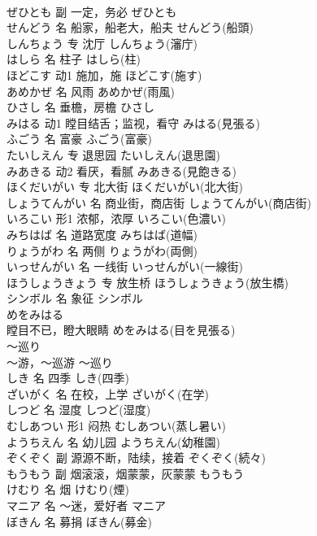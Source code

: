 \documentclass[8pt]{extreport}
\begin{document}
\begin{CJK}{UTF8}{min}
\\	ぜひとも	副	一定，务必	ぜひとも	
\\	せんどう	名	船家，船老大，船夫	せんどう(船頭)	
\\	しんちょう	专	沈厅	しんちょう(瀋庁)	
\\	はしら	名	柱子	はしら(柱)	
\\	ほどこす	动1	施加，施	ほどこす(施す)	
\\	あめかぜ	名	风雨	あめかぜ(雨風)	
\\	ひさし	名	垂檐，房檐	ひさし	
\\	みはる	动1	瞠目结舌；监视，看守	みはる(見張る)	
\\	ふごう	名	富豪	ふごう(富豪)	
\\	たいしえん	专	退思园	たいしえん(退思園)	
\\	みあきる	动2	看厌，看腻	みあきる(見飽きる)	
\\	ほくだいがい	专	北大街	ほくだいがい(北大街)	
\\	しょうてんがい	名	商业街，商店街	しょうてんがい(商店街)	
\\	いろこい	形1	浓郁，浓厚	いろこい(色濃い)	
\\	みちはば	名	道路宽度	みちはば(道幅)	
\\	りょうがわ	名	两侧	りょうがわ(両側)	
\\	いっせんがい	名	一线街	いっせんがい(一線街)	
\\	ほうしょうきょう	专	放生桥	ほうしょうきょう(放生橋)	
\\	シンボル	名	象征	シンボル	
\\	めをみはる	
\\	瞠目不已，瞪大眼睛	めをみはる(目を見張る)	
\\	～巡り	
\\	～游，～巡游	～巡り	
\\	しき	名	四季	しき(四季)	
\\	ざいがく	名	在校，上学	ざいがく(在学)	
\\	しつど	名	湿度	しつど(湿度)	
\\	むしあつい	形1	闷热	むしあつい(蒸し暑い)	
\\	ようちえん	名	幼儿园	ようちえん(幼稚園)	
\\	ぞくぞく	副	源源不断，陆续，接着	ぞくぞく(続々)	
\\	もうもう	副	烟滚滚，烟蒙蒙，灰蒙蒙	もうもう	
\\	けむり	名	烟	けむり(煙)	
\\	マニア	名	～迷，爱好者	マニア	
\\	ぼきん	名	募捐	ぼきん(募金)	

\end{CJK}
\end{document}
